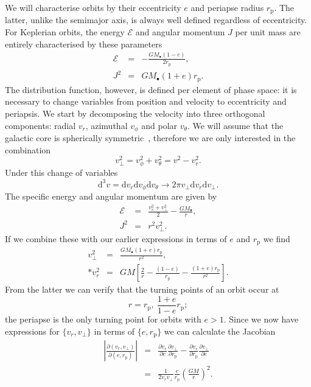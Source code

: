 \documentclass[useAMS,usedcolumn,usegraphicx,usenatbib]{mn2e}
\newcommand{\sub}[1]{\ensuremath{_\mathrm{#1}}}
\newcommand{\dd}{\ensuremath{\mathrm{d}}}
\newcommand{\partialdiff}[2]{\ensuremath{\frac{\partial {#1}}{\partial {#2}}}}
\newcommand{\recip}[1]{\ensuremath{\frac{1}{#1}}}
\begin{document}
We will characterise orbits by their eccentricity $e$ and periapse radius $r\sub{p}$. The latter, unlike the semimajor axis, is always well defined regardless of eccentricity. For Keplerian orbits, the energy $\mathcal{E}$ and angular momentum $J$ per unit mass are entirely characterised by these parameters
\begin{eqnarray}
\mathcal{E} &=& -\frac{GM_\bullet(1 - e)}{2r\sub{p}},\\
J^2 &=& GM_\bullet(1 + e)r\sub{p}.
\end{eqnarray}
The distribution function, however, is defined per element of phase space: it is necessary to change variables from position and velocity to eccentricity and periapsis. We start by decomposing the velocity into three orthogonal components: radial $v_r$, azimuthal $v_\phi$ and polar $v_\theta$. We will assume that the galactic core is spherically symmetric~\citep{Genzel2003, Schodel2007}, therefore we are only interested in the combination
\begin{equation}
v_\perp^2 = v_\phi^2 + v_\theta^2 = v^2 - v_r^2.
\end{equation}
Under this change of variables
\begin{equation}
\dd^3v = \dd v_r \dd v_\phi \dd v_\theta \rightarrow 2\pi v_\perp \dd v_r \dd v_\perp.
\end{equation}
The specific energy and angular momentum are given by
\begin{eqnarray}
\mathcal{E} &=& \frac{v_r^2 + v_\perp^2}{2} - \frac{GM_\bullet}{r},\\
J^2 &=& r^2 v_\perp^2.
\end{eqnarray}
If we combine these with our earlier expressions in terms of $e$ and $r\sub{p}$ we find
\begin{eqnarray}
v_\perp^2 &=& \frac{GM_\bullet(1 + e)r\sub{p}}{r^2}, \nonumber \\*
v_r^2 &=& GM\left[\frac{2}{r} - \frac{(1 - e)}{r\sub{p}} - \frac{(1 + e)r\sub{p}}{r^2}\right].
\end{eqnarray}
From the latter we can verify that the turning points of an orbit occur at
\begin{equation}
r = r\sub{p}, \: \frac{1+e}{1-e}r\sub{p};
\end{equation}
the periapse is the only turning point for orbits with $e > 1$. Since we now have expressions for $\{v_r, v_\perp\}$ in terms of $\{e, r\sub{p}\}$ we can calculate the Jacobian
\begin{eqnarray}
\left|\frac{\partial(v_r, v_\perp)}{\partial(e, r\sub{p})}\right| &=& \partialdiff{v_r}{e}\partialdiff{v_\perp}{r\sub{p}} - \partialdiff{v_r}{r\sub{p}}\partialdiff{v_\perp}{e} \\
 &=& \recip{2v_rv_\perp}\frac{e}{r\sub{p}}\left(\frac{GM}{r}\right)^2.
\end{eqnarray}
\end{document}
